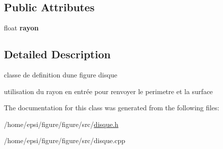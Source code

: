 \subsection*{Public Attributes}
\begin{DoxyCompactItemize}
\item 
\mbox{\label{classdisque_ac9ae86ee1309e5fec237632aeb70c0af}} 
float {\bfseries rayon}
\end{DoxyCompactItemize}


\subsection{Detailed Description}
classe de definition d\textquotesingle{}une figure disque 

utilisation du rayon en entrée pour renvoyer le perimetre et la surface 

The documentation for this class was generated from the following files\+:\begin{DoxyCompactItemize}
\item 
/home/epsi/figure/figure/src/\hyperlink{disque_8h}{disque.\+h}\item 
/home/epsi/figure/figure/src/disque.\+cpp\end{DoxyCompactItemize}
